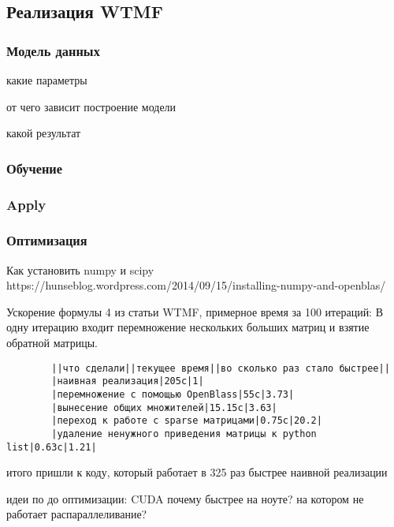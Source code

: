\subsection{Реализация WTMF}
    \subsubsection{Модель данных}
        какие параметры

        от чего зависит построение модели

        какой результат

    \subsubsection{Обучение}

    \subsubsection{Apply}

    \subsubsection{Оптимизация}
        Как установить numpy и scipy
        https://hunseblog.wordpress.com/2014/09/15/installing-numpy-and-openblas/


        Ускорение формулы 4 из статьи WTMF, примерное время за 100 итераций:
        В одну итерацию входит перемножение нескольких больших матриц и взятие обратной матрицы.

        \begin{verbatim}
        ||что сделали||текущее время||во сколько раз стало быстрее||
        |наивная реализация|205с|1|
        |перемножение с помощью OpenBlass|55с|3.73|
        |вынесение общих множителей|15.15с|3.63|
        |переход к работе с sparse матрицами|0.75с|20.2|
        |удаление ненужного приведения матрицы к python list|0.63c|1.21|
        \end{verbatim}
        итого пришли к коду, который работает в 325 раз быстрее наивной реализации

        идеи по до оптимизации: CUDA
        почему быстрее на ноуте? на котором не работает распараллеливание?